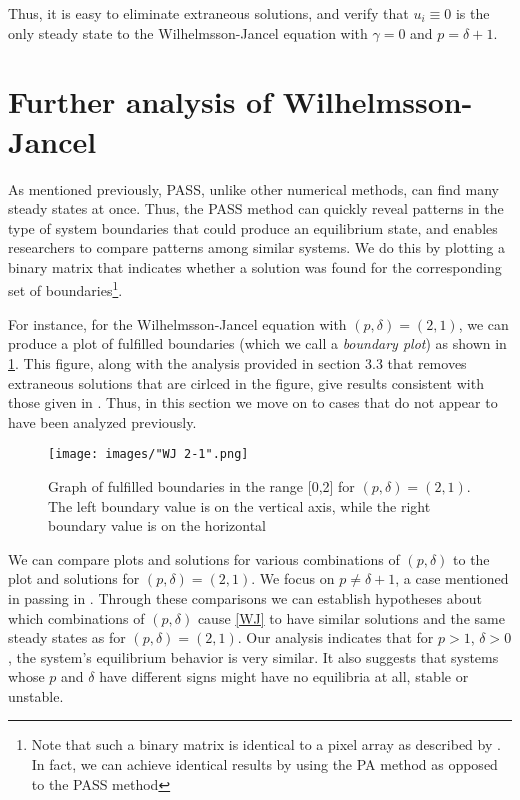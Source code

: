 \documentclass[11pt]{article}
\begin{document}
Thus, it is easy to eliminate extraneous solutions, and verify that $u_i \equiv 0$ is the only steady state to the Wilhelmsson-Jancel equation with $\gamma = 0$ and $p = \delta + 1$.

\section{Further analysis of Wilhelmsson-Jancel}

As mentioned previously, PASS, unlike other numerical methods, can find many steady states at once. Thus, the PASS method can quickly reveal patterns in the type of system boundaries that could produce an equilibrium state, and enables researchers to compare patterns among similar systems. We do this by plotting a binary matrix that indicates whether a solution was found for the corresponding set of boundaries\footnote{Note that such a binary matrix is identical to a pixel array as described by \citep{Introduction_to_PA}. In fact, we can achieve identical results by using the PA method as opposed to the PASS method}.

For instance, for the Wilhelmsson-Jancel equation with $(p, \delta) = (2,1)$, we can produce a plot of fulfilled boundaries (which we call a \textit{boundary plot}) as shown in \cref{21plot}. This figure, along with the analysis provided in section 3.3 that removes extraneous solutions that are cirlced in the figure, give results consistent with those given in \citep{WJ}. Thus, in this section we move on to cases that do not appear to have been analyzed previously.

\begin{figure}[h]
\begin{center}
\texttt{[image: images/"WJ 2-1".png]}
\caption{Graph of fulfilled boundaries in the range [0,2] for $(p, \delta) = (2,1)$. The left boundary value is on the vertical axis, while the right boundary value is on the horizontal}
\label{21plot}
\end{center}
\end{figure}

We can compare plots and solutions for various combinations of $(p, \delta)$ to the plot and solutions for $(p, \delta) = (2,1)$. We focus on $p \ne \delta + 1$, a case mentioned in passing in \citep{WJ}. Through these comparisons we can establish hypotheses about which combinations of $(p, \delta)$ cause \cref{WJ} to have similar solutions and the same steady states as for $(p, \delta) = (2,1)$. Our analysis indicates that for $p > 1$, $\delta > 0$, the system's equilibrium behavior is very similar. It also suggests that systems whose $p$ and $\delta$ have different signs might have no equilibria at all, stable or unstable. 
\end{document}
